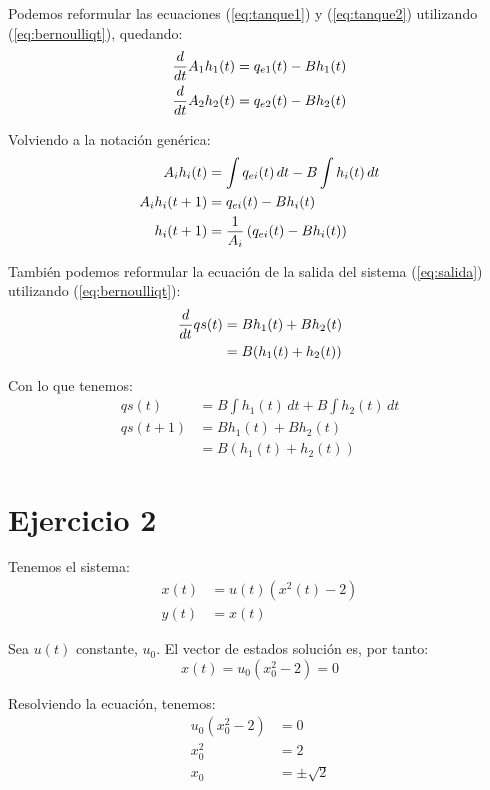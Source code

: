 \documentclass[12pt]{article}
\begin{document}
Podemos reformular las ecuaciones (\ref{eq:tanque1}) y (\ref{eq:tanque2}) utilizando (\ref{eq:bernoulliqt}), quedando:
\begin{align*}
    {d \over dt} A_1 h_1(t) &= q_{e1}(t) - B h_1(t) \\
    {d \over dt} A_2 h_2(t) &= q_{e2}(t) - B h_2(t)
\end{align*}

Volviendo a la notación genérica:
\begin{align*}
    A_i h_i(t) &= \int q_{ei}(t) \, dt - B \int h_i(t) \, dt \\
    A_i h_i(t + 1) &= q_{ei}(t) - B h_i(t) \\
    h_i(t + 1) &= {1 \over A_i} \left( q_{ei}(t) - B h_i(t) \right)
\end{align*}

También podemos reformular la ecuación de la salida del sistema (\ref{eq:salida}) utilizando (\ref{eq:bernoulliqt}):
\begin{align*}
    {d \over dt} qs(t) &= B h_1(t) + B h_2(t) \\
                       &= B (h_1(t) + h_2(t))
\end{align*}

Con lo que tenemos:
\begin{align*}
    qs(t) &= B \int h_1(t) \, dt + B \int h_2(t) \, dt \\
    qs(t + 1) &= B h_1(t) + B h_2(t) \\
              &= B (h_1(t) + h_2(t))
\end{align*}

\newpage

\section{Ejercicio 2}
Tenemos el sistema:
\begin{align*}
x(t) &= u(t) (x^2(t) - 2) \\
y(t) &= x(t)
\end{align*}

Sea $u(t)$ constante, $u_0$. El vector de estados solución es, por tanto:
\begin{equation*}
    x(t) = u_0 (x_0^2 - 2) = 0
\end{equation*}

Resolviendo la ecuación, tenemos:
\begin{align*}
    u_0 (x_0^2 - 2) &= 0\\
    x_0^2 &= 2\\
    x_0 &= \pm \sqrt{2}
\end{align*}
\end{document}
